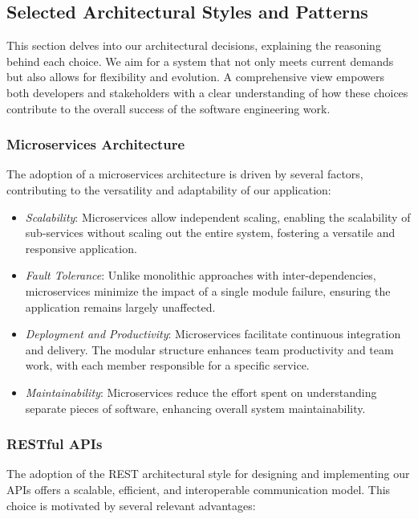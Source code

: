 \subsection{Selected Architectural Styles and Patterns}

This section delves into our architectural decisions, explaining the reasoning behind each choice. We aim for a system that not only meets current demands but also allows for flexibility and evolution. A comprehensive view empowers both developers and stakeholders with a clear understanding of how these choices contribute to the overall success of the software engineering work.

\subsubsection*{Microservices Architecture}

The adoption of a microservices architecture is driven by several factors, contributing to the versatility and adaptability of our application:

\begin{itemize}
    \item \textit{Scalability}: Microservices allow independent scaling, enabling the scalability of sub-services without scaling out the entire system, fostering a versatile and responsive application.
  
    \item \textit{Fault Tolerance}: Unlike monolithic approaches with inter-dependencies, microservices minimize the impact of a single module failure, ensuring the application remains largely unaffected.
  
    \item \textit{Deployment and Productivity}: Microservices facilitate continuous integration and delivery. The modular structure enhances team productivity and team work, with each member responsible for a specific service.
  
    \item \textit{Maintainability}: Microservices reduce the effort spent on understanding separate pieces of software, enhancing overall system maintainability.
\end{itemize}

\subsubsection*{RESTful APIs}

The adoption of the REST architectural style for designing and implementing our APIs offers a scalable, efficient, and interoperable communication model. This choice is motivated by several relevant advantages:

